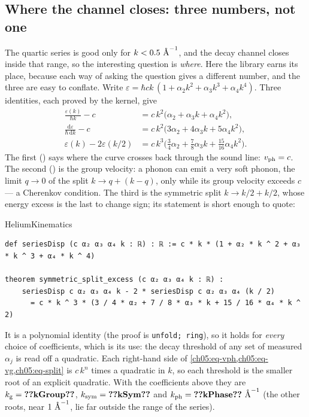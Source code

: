 \subsection{Where the channel closes: three numbers, not one}
The quartic series is good only for $k<0.5\ \text{\AA}^{-1}$, and the decay channel closes inside that range, so the interesting question is \emph{where}.
Here the library earns its place, because each way of asking the question gives a different number, and the three are easy to conflate.
Write $\varepsilon=\hbar ck\,(1+\alpha_2k^2+\alpha_3k^3+\alpha_4k^4)$.
Three identities, each proved by the kernel, give
\begin{align}
 \frac{\varepsilon(k)}{\hbar k}-c &= c\,k^{2}\bigl(\alpha_2+\alpha_3k+\alpha_4k^2\bigr), \label{ch05:eq-vph}\\
 \frac{\mathrm d\varepsilon}{\hbar\,\mathrm dk}-c &= c\,k^{2}\bigl(3\alpha_2+4\alpha_3k+5\alpha_4k^2\bigr), \label{ch05:eq-vg}\\
 \varepsilon(k)-2\varepsilon(k/2) &= c\,k^{3}\bigl(\tfrac34\alpha_2+\tfrac78\alpha_3k+\tfrac{15}{16}\alpha_4k^2\bigr). \label{ch05:eq-split}
\end{align}
The first () says where the curve crosses back through the sound line: $v_{\rm ph}=c$.
The second () is the group velocity: a phonon can emit a very soft phonon, the limit $q\to0$ of the split $k\to q+(k-q)$, only while its group velocity exceeds $c$ --- a Cherenkov condition.
The third is the symmetric split $k\to k/2+k/2$, whose energy excess is the last to change sign; its statement is short enough to quote:

\begin{leanbox}{HeliumKinematics}
\begin{lstlisting}[style=lean]
def seriesDisp (c α₂ α₃ α₄ k : ℝ) : ℝ := c * k * (1 + α₂ * k ^ 2 + α₃ * k ^ 3 + α₄ * k ^ 4)

theorem symmetric_split_excess (c α₂ α₃ α₄ k : ℝ) :
    seriesDisp c α₂ α₃ α₄ k - 2 * seriesDisp c α₂ α₃ α₄ (k / 2)
      = c * k ^ 3 * (3 / 4 * α₂ + 7 / 8 * α₃ * k + 15 / 16 * α₄ * k ^ 2)
\end{lstlisting}
\end{leanbox}

\noindent It is a polynomial identity (the proof is \texttt{unfold; ring}), so it holds for \emph{every} choice of coefficients, which is its use: the decay threshold of any set of measured $\alpha_j$ is read off a quadratic.
Each right-hand side of \cref{ch05:eq-vph,ch05:eq-vg,ch05:eq-split} is $c\,k^n$ times a quadratic in $k$, so each threshold is the smaller root of an explicit quadratic.
With the coefficients above they are $k_{\rm g}=\cfiveV{kGroup}$, $k_{\rm sym}=\cfiveV{kSym}$ and $k_{\rm ph}=\cfiveV{kPhase}\ \cfiveAng^{-1}$ (the other roots, near $1\ \text{\AA}^{-1}$, lie far outside the range of the series).

